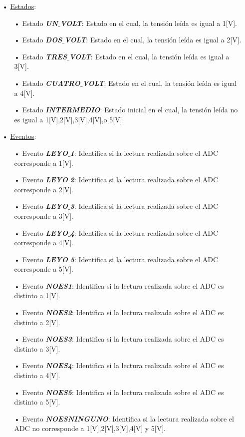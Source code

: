 \documentclass[12pt,letterpaper]{article}
\begin{document}
\begin{enumerate}
\item[•]\underline{Estados}:
\begin{enumerate}
\item[•]Estado \textit{\textbf{UN$\_$VOLT}}: Estado en el cual, la tensión leída es igual a 1[V].
\item[•]Estado \textit{\textbf{DOS$\_$VOLT}}: Estado en el cual, la tensión leída es igual a 2[V].
\item[•]Estado \textit{\textbf{TRES$\_$VOLT}}: Estado en el cual, la tensión leída es igual a 3[V].
\item[•]Estado \textit{\textbf{CUATRO$\_$VOLT}}: Estado en el cual, la tensión leída es igual a 4[V].
\item[•]Estado \textit{\textbf{INTERMEDIO}}: Estado inicial en el cual, la tensión leída no es igual a 1[V],2[V],3[V],4[V],o 5[V].
\end{enumerate}
\item[•]\underline{Eventos}:
\begin{enumerate}
\item[•]Evento \textit{\textbf{LEYO$\_$1}}: Identifica si la lectura realizada sobre el ADC corresponde a 1[V].
\item[•]Evento \textit{\textbf{LEYO$\_$2}}: Identifica si la lectura realizada sobre el ADC corresponde a 2[V].
\item[•]Evento \textit{\textbf{LEYO$\_$3}}: Identifica si la lectura realizada sobre el ADC corresponde a 3[V].
\item[•]Evento \textit{\textbf{LEYO$\_$4}}: Identifica si la lectura realizada sobre el ADC corresponde a 4[V].
\item[•]Evento \textit{\textbf{LEYO$\_$5}}: Identifica si la lectura realizada sobre el ADC corresponde a 5[V].
\item[•]Evento \textit{\textbf{NOES1}}: Identifica si la lectura realizada sobre el ADC es distinto a 1[V].
\item[•]Evento \textit{\textbf{NOES2}}: Identifica si la lectura realizada sobre el ADC es distinto a 2[V].
\item[•]Evento \textit{\textbf{NOES3}}: Identifica si la lectura realizada sobre el ADC es distinto a 3[V].
\item[•]Evento \textit{\textbf{NOES4}}: Identifica si la lectura realizada sobre el ADC es distinto a 4[V].
\item[•]Evento \textit{\textbf{NOES5}}: Identifica si la lectura realizada sobre el ADC es distinto a 5[V].
\item[•]Evento \textit{\textbf{NOESNINGUNO}}: Identifica si la lectura realizada sobre el ADC no corresponde a 1[V],2[V],3[V],4[V] y 5[V].
\end{enumerate}
\end{enumerate}
\end{document}
